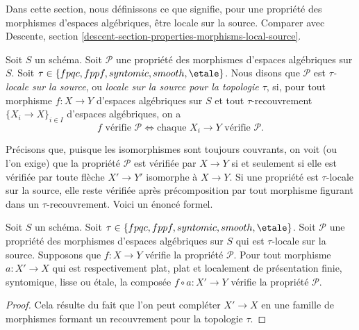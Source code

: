 \noindent
Dans cette section, nous définissons ce que signifie, pour une propriété des morphismes
d'espaces algébriques, être locale sur la source. Comparer avec
Descente, section \ref{descent-section-properties-morphisms-local-source}.

\begin{definition}
\label{definition-property-morphisms-local-source}
Soit $S$ un schéma.
Soit $\mathcal{P}$ une propriété des morphismes d'espaces algébriques sur $S$.
Soit $\tau \in \{fpqc, \linebreak[0] fppf, \linebreak[0] syntomic, \linebreak[0]
smooth, \linebreak[0] \etale\}$. Nous disons que $\mathcal{P}$ est
{\it $\tau$-locale sur la source}, ou
{\it locale sur la source pour la topologie $\tau$}, si, pour
tout morphisme $f : X \to Y$ d'espaces algébriques sur $S$ et tout
$\tau$-recouvrement $\{X_i \to X\}_{i \in I}$ d'espaces algébriques, on a
$$
f \text{ vérifie }\mathcal{P}
\Leftrightarrow
\text{chaque }X_i \to Y\text{ vérifie }\mathcal{P}.
$$
\end{definition}

\noindent
Précisons que, puisque les isomorphismes sont toujours couvrants,
on voit (ou l'on exige) que la propriété $\mathcal{P}$ est vérifiée par $X \to Y$
si et seulement si elle est vérifiée par toute flèche $X' \to Y'$ isomorphe à $X \to Y$.
Si une propriété est $\tau$-locale sur la source, elle reste vérifiée après
précomposition par tout morphisme figurant dans un $\tau$-recouvrement. Voici
un énoncé formel.

\begin{lemma}
\label{lemma-precompose-property-local-source}
Soit $S$ un schéma.
Soit $\tau \in \{fpqc, \linebreak[0] fppf, \linebreak[0] syntomic, \linebreak[0]
smooth, \linebreak[0] \etale\}$.
Soit $\mathcal{P}$ une propriété des morphismes d'espaces algébriques sur $S$
qui est $\tau$-locale sur la source. Supposons que $f : X \to Y$ vérifie la propriété
$\mathcal{P}$. Pour tout morphisme $a : X' \to X$ qui est respectivement
plat, plat et localement de présentation finie, syntomique,
lisse ou \'etale, la composée $f \circ a : X' \to Y$ vérifie
la propriété $\mathcal{P}$.
\end{lemma}

\begin{proof}
Cela résulte du fait que l'on peut compléter $X' \to X$ en une famille de
morphismes formant un recouvrement pour la topologie $\tau$.
\end{proof}

